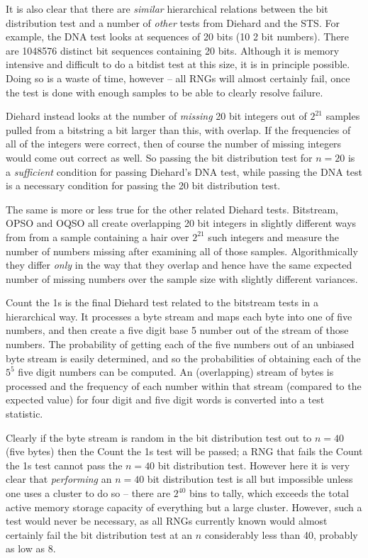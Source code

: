 \documentclass[12pt]{article}
\begin{document}
It is also clear that there are {\em similar} hierarchical relations
between the bit distribution test and a number of {\em other} tests from
Diehard and the STS.  For example, the DNA test looks at sequences of 20
bits (10 2 bit numbers).  There are 1048576 distinct bit sequences
containing 20 bits.  Although it is memory intensive and difficult to do
a bitdist test at this size, it is in principle possible.  Doing so is a
waste of time, however -- all RNGs will almost certainly fail, once the
test is done with enough samples to be able to clearly resolve failure.

Diehard instead looks at the number of {\em missing} 20 bit integers out
of $2^{21}$ samples pulled from a bitstring a bit larger than this, with
overlap.  If the frequencies of all of the integers were correct, then
of course the number of missing integers would come out correct as well.
So passing the bit distribution test for $n = 20$ is a {\em sufficient}
condition for passing Diehard's DNA test, while passing the DNA test is
a necessary condition for passing the 20 bit distribution test.  

The same is more or less true for the other related Diehard tests.
Bitstream, OPSO and OQSO all create overlapping 20 bit integers in
slightly different ways from from a sample containing a hair over
$2^{21}$ such integers and measure the number of numbers missing after
examining all of those samples.  Algorithmically they differ {\em only}
in the way that they overlap and hence have the same expected number of
missing numbers over the sample size with slightly different variances.

Count the 1s is the final Diehard test related to the bitstream tests in
a hierarchical way.  It processes a byte stream and maps each byte into
one of five numbers, and then create a five digit base 5 number out of
the stream of those numbers.  The probability of getting each of the
five numbers out of an unbiased byte stream is easily determined, and so
the probabilities of obtaining each of the $5^5$ five digit numbers can
be computed.  An (overlapping) stream of bytes is processed and the
frequency of each number within that stream (compared to the expected
value) for four digit and five digit words is converted into a test
statistic.

Clearly if the byte stream is random in the bit distribution test out to
$n = 40$ (five bytes) then the Count the 1s test will be passed; a RNG
that fails the Count the 1s test cannot pass the $n = 40$ bit
distribution test.  However here it is very clear that {\em performing}
an $n = 40$ bit distribution test is all but impossible unless one uses
a cluster to do so -- there are $2^40$ bins to tally, which exceeds the
total active memory storage capacity of everything but a large cluster.
However, such a test would never be necessary, as all RNGs currently
known would almost certainly fail the bit distribution test at an $n$
considerably less than 40, probably as low as 8.
\end{document}
